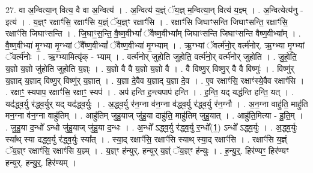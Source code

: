 \documentclass[17pt]{extarticle}
\begin{document}
27. वा अ॒न्वित्या॒न् वित्य॒ वै वा अ॒न्वित्य॑ । . अ॒न्वित्य॑ य॒ज्ञ्ं ॅय॒ज्ञ् म॒न्वित्या॒न् वित्य॑ य॒ज्ञ्म् । . अ॒न्वित्येत्य॑नु - इत्य॑ । . य॒ज्ञ्ꣳ रक्षाꣳ॑सि॒ रक्षाꣳ॑सि य॒ज्ञ्ं ॅय॒ज्ञ्ꣳ रक्षाꣳ॑सि । . रक्षाꣳ॑सि जिघाꣳसन्ति जिघाꣳसन्ति॒ रक्षाꣳ॑सि॒ रक्षाꣳ॑सि जिघाꣳसन्ति । . जि॒घाꣳ॒॒स॒न्ति॒ वै॒ष्ण॒वीभ्यां᳚ ॅवैष्ण॒वीभ्या᳚म् जिघाꣳसन्ति जिघाꣳसन्ति वैष्ण॒वीभ्या᳚म् । . वै॒ष्ण॒वीभ्या॑ मृ॒ग्भ्या मृ॒ग्भ्यां ॅवै᳚ष्ण॒वीभ्यां᳚ ॅवैष्ण॒वीभ्या॑ मृ॒ग्भ्याम् । . ऋ॒ग्भ्यां ॅवर्त्म॑नो॒र् वर्त्म॑नोर्. ऋ॒ग्भ्या मृ॒ग्भ्यां ॅवर्त्म॑नोः । . ऋ॒ग्भ्यामित्यृ॑क् - भ्याम् । . वर्त्म॑नोर् जुहोति जुहोति॒ वर्त्म॑नो॒र् वर्त्म॑नोर् जुहोति । . जु॒हो॒ति॒ य॒ज्ञो य॒ज्ञो जु॑होति जुहोति य॒ज्ञ्ः । . य॒ज्ञो वै वै य॒ज्ञो य॒ज्ञो वै । . वै विष्णु॒र् विष्णु॒र् वै वै विष्णुः॑ । . विष्णु॑र् य॒ज्ञाद् य॒ज्ञाद् विष्णु॒र् विष्णु॑र् य॒ज्ञात् । . य॒ज्ञा दे॒वैव य॒ज्ञाद् य॒ज्ञा दे॒व । . ए॒व रक्षाꣳ॑सि॒ रक्षाꣳ॑स्ये॒वैव रक्षाꣳ॑सि । . रक्षाꣳ॒॒ स्यपाप॒ रक्षाꣳ॑सि॒ रक्षाꣳ॒॒ स्यप॑ । . अप॑ हन्ति ह॒न्त्यपाप॑ हन्ति । . ह॒न्ति॒ यद् यद्ध॑न्ति हन्ति॒ यत् । . यद॑द्ध्व॒र्यु र॑द्ध्व॒र्युर् यद् यद॑द्ध्व॒र्युः । . अ॒द्ध्व॒र्यु र॑न॒ग्ना व॑न॒ग्ना व॑द्ध्व॒र्यु र॑द्ध्व॒र्यु र॑न॒ग्नौ । . अ॒न॒ग्ना वाहु॑ति॒ माहु॑ति मन॒ग्ना व॑न॒ग्ना वाहु॑तिम् । . आहु॑तिम् जुहु॒याज् जु॑हु॒या दाहु॑ति॒ माहु॑तिम् जुहु॒यात् । . आहु॑ति॒मित्या - हु॒ति॒म् । . जु॒हु॒या द॒न्धो᳚ ऽन्धो जु॑हु॒याज् जु॑हु॒या द॒न्धः । . अ॒न्धो᳚ ऽद्ध्व॒र्यु र॑द्ध्व॒र्यु र॒न्धो᳚(1॒) ऽन्धो᳚ ऽद्ध्व॒र्युः । . अ॒द्ध्व॒र्युः स्या᳚थ् स्या दद्ध्व॒र्यु र॑द्ध्व॒र्युः स्या᳚त् । . स्या॒द् रक्षाꣳ॑सि॒ रक्षाꣳ॑सि स्याथ् स्या॒द् रक्षाꣳ॑सि । . रक्षाꣳ॑सि य॒ज्ञ्ं ॅय॒ज्ञ्ꣳ रक्षाꣳ॑सि॒ रक्षाꣳ॑सि य॒ज्ञ्म् । . य॒ज्ञ्ꣳ ह॑न्युर्. हन्युर् य॒ज्ञ्ं ॅय॒ज्ञ्ꣳ ह॑न्युः । . ह॒न्यु॒र्॒. हिर॑ण्यꣳ॒॒ हिर॑ण्यꣳ हन्युर्. हन्यु॒र्॒. हिर॑ण्यम् । \newline
\end{document}
